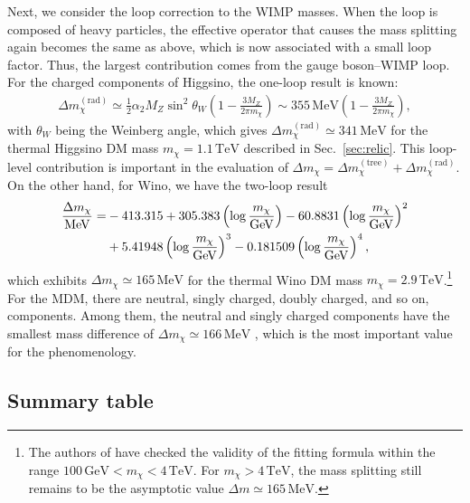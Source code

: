 \documentclass[12pt,twoside,book]{article}
\begin{document}
Next, we consider the loop correction to the WIMP masses.
When the loop is composed of heavy particles, the effective operator that causes the mass splitting again becomes the same as above, which is now associated with a small loop factor.
Thus, the largest contribution comes from the gauge boson--WIMP loop.
For the charged components of Higgsino, the one-loop result is known: \cite{Fukuda:2017jmk}
\begin{align}
  \Delta m_\chi^{\mathrm{(rad)}} \simeq \frac{1}{2} \alpha_2 M_Z \sin^2 \theta_W
  \left( 1 - \frac{3 M_Z}{2\pi m_\chi} \right)
  \sim 355\,\mathrm{MeV} \left( 1 - \frac{3 M_Z}{2\pi m_\chi} \right),
  \label{eq:Higgsino_delm_rad}
\end{align}
with $\theta_W$ being the Weinberg angle, which gives $\Delta m_\chi^{\mathrm{(rad)}} \simeq 341\,\mathrm{MeV}$ for the thermal Higgsino DM mass $m_\chi = 1.1\,\mathrm{TeV}$ described in Sec.~\ref{sec:relic}.
This loop-level contribution is important in the evaluation of $\Delta m_\chi = \Delta m_\chi^{\mathrm{(tree)}} + \Delta m_\chi^{\mathrm{(rad)}}$.
On the other hand, for Wino, we have the two-loop result \cite{Ibe:2012sx}
\newcommand{\logmchi}{\left( \log \frac{m_\chi}{\mathrm{GeV}} \right)}
\begin{align}
  \frac{\Delta m_\chi}{\mathrm{MeV}} =
  &-413.315 + 305.383 \logmchi - 60.8831 \logmchi^2 \notag \\
  &+ 5.41948 \logmchi^3 - 0.181509 \logmchi^4,
\end{align}
which exhibits $\Delta m_\chi \simeq 165\,\mathrm{MeV}$ for the thermal Wino DM mass $m_\chi = 2.9\,\mathrm{TeV}$.\footnote{
  The authors of \cite{Ibe:2012sx} have checked the validity of the fitting formula within the range $100\, \mathrm{GeV} < m_\chi < 4\,\mathrm{TeV}$.
  For $m_\chi > 4\,\mathrm{TeV}$, the mass splitting still remains to be the asymptotic value $\Delta m \simeq 165\,\mathrm{MeV}$.
}
For the MDM, there are neutral, singly charged, doubly charged, and so on, components.
Among them, the neutral and singly charged components have the smallest mass difference of $\Delta m_\chi \simeq 166\, \mathrm{MeV}$ \cite{Cirelli:2005uq}, which is the most important value for the phenomenology.


\subsection{Summary table}
\label{sec:model_summary}
\end{document}
